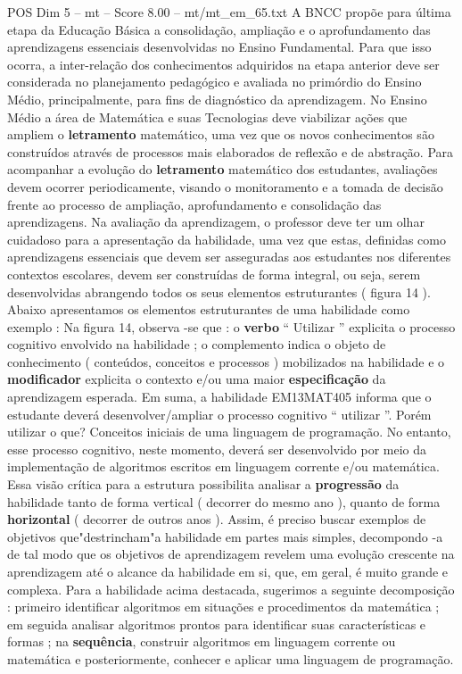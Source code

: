 \begin{textsample}{POS Dim 5 – mt – Score 8.00 – mt/mt\_em\_65.txt}
A BNCC propõe para última etapa da Educação Básica a consolidação, ampliação e o aprofundamento das aprendizagens essenciais desenvolvidas no Ensino Fundamental.
Para que isso ocorra, a inter-relação dos conhecimentos adquiridos na etapa anterior deve ser considerada no planejamento pedagógico e avaliada no primórdio do Ensino Médio, principalmente, para fins de diagnóstico da aprendizagem.
No Ensino Médio a área de Matemática e suas Tecnologias deve viabilizar ações que ampliem o \textbf{letramento} matemático, uma vez que os novos conhecimentos são construídos através de processos mais elaborados de reflexão e de abstração.
Para acompanhar a evolução do \textbf{letramento} matemático dos estudantes, avaliações devem ocorrer periodicamente, visando o monitoramento e a tomada de decisão frente ao processo de ampliação, aprofundamento e consolidação das aprendizagens.
Na avaliação da aprendizagem, o professor deve ter um olhar cuidadoso para a apresentação da habilidade, uma vez que estas, definidas como aprendizagens essenciais que devem ser asseguradas aos estudantes nos diferentes contextos escolares, devem ser construídas de forma integral, ou seja, serem desenvolvidas abrangendo todos os seus elementos estruturantes ( figura 14 ).
Abaixo apresentamos os elementos estruturantes de uma habilidade como exemplo : Na figura 14, observa -se que : o \textbf{verbo} “ Utilizar ” explicita o processo cognitivo envolvido na habilidade ; o complemento indica o objeto de conhecimento ( conteúdos, conceitos e processos ) mobilizados na habilidade e o \textbf{modificador} explicita o contexto e/ou uma maior \textbf{especificação} da aprendizagem esperada.
Em suma, a habilidade EM13MAT405 informa que o estudante deverá desenvolver/ampliar o processo cognitivo “ utilizar ”.
Porém utilizar o que?
Conceitos iniciais de uma linguagem de programação.
No entanto, esse processo cognitivo, neste momento, deverá ser desenvolvido por meio da implementação de algoritmos escritos em linguagem corrente e/ou matemática.
Essa visão crítica para a estrutura possibilita analisar a \textbf{progressão} da habilidade tanto de forma vertical ( decorrer do mesmo ano ), quanto de forma \textbf{horizontal} ( decorrer de outros anos ).
Assim, é preciso buscar exemplos de objetivos que"destrincham"a habilidade em partes mais simples, decompondo -a de tal modo que os objetivos de aprendizagem revelem uma evolução crescente na aprendizagem até o alcance da habilidade em si, que, em geral, é muito grande e complexa.
Para a habilidade acima destacada, sugerimos a seguinte decomposição : primeiro identificar algoritmos em situações e procedimentos da matemática ; em seguida analisar algoritmos prontos para identificar suas características e formas ; na \textbf{sequência}, construir algoritmos em linguagem corrente ou matemática e posteriormente, conhecer e aplicar uma linguagem de programação.

\end{textsample}
